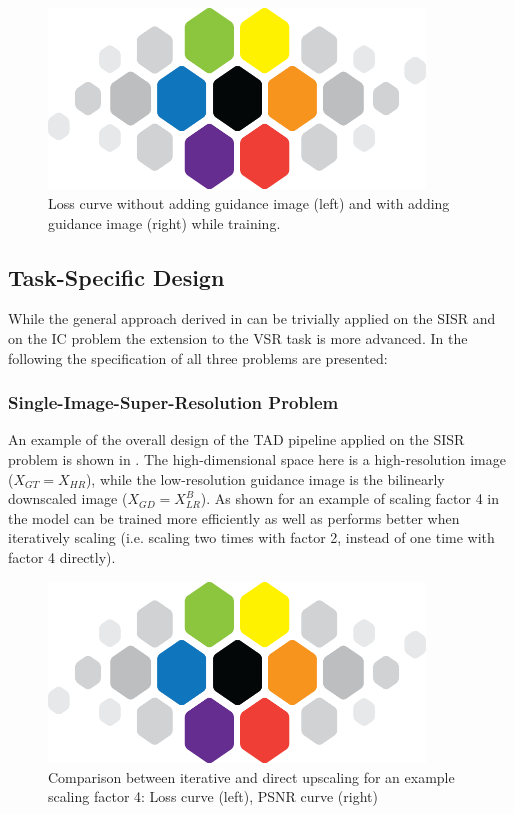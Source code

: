 \begin{figure}[!htbp]
	\centering
	\includegraphics[width=10cm]{figures/cvl}
	\caption{Loss curve without adding guidance image (left) and with
  adding guidance image (right) while training.}
  \label{fig:loss_w_wo_adding_guidance}
\end{figure}

\subsection{Task-Specific Design}
\label{sec:Approach_TSD}
While the general approach derived in  can be trivially
applied on the \ac{SISR} and on the \ac{IC} problem the extension to the
\ac{VSR} task is more advanced. In the following the specification of all three
problems are presented:

\subsubsection*{Single-Image-Super-Resolution Problem}
An example of the overall design of the \ac{TAD} pipeline applied on the
\ac{SISR} problem is shown in . The high-dimensional
space here is a high-resolution image ($X_{GT} = X_{HR}$), while the
low-resolution guidance image is the bilinearly downscaled image
($X_{GD} = X_{LR}^{B}$). As shown for an example of scaling factor 4 in
 the model can be trained more
efficiently as well as performs better when iteratively scaling (i.e. scaling
two times with factor 2, instead of one time with factor 4 directly).

\begin{figure}[!htbp]
	\centering
	\includegraphics[width=10cm]{figures/cvl}
	\caption{Comparison between iterative and direct upscaling for an example
  scaling factor 4: Loss curve (left), PSNR curve (right)}
  \label{fig:comparison_scaling_iter_vs_direct}
\end{figure}


